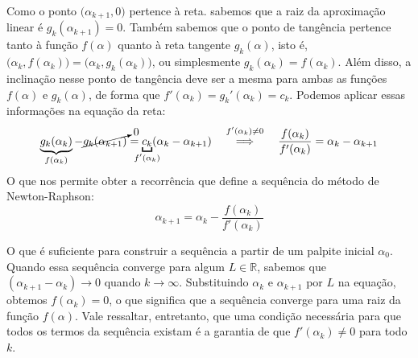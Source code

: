 Como o ponto $\big(\alpha_{k+1}, 0\big)$ pertence à reta.
sabemos que a raiz da aproximação linear é $g_k(\alpha_{k+1}) = 0$.
Também sabemos que o ponto de tangência
pertence tanto à função $f(\alpha)$
quanto à reta tangente $g_k(\alpha)$, isto é,
$\big(\alpha_k, f(\alpha_k)\big) = \big(\alpha_k, g_k(\alpha_k)\big)$,
ou simplesmente $g_k(\alpha_k) = f(\alpha_k)$.
Além disso, a inclinação nesse ponto de tangência
deve ser a mesma para ambas as funções $f(\alpha)$ e $g_k(\alpha)$,
de forma que $f'(\alpha_k) = g_k'(\alpha_k) = c_k$.
Podemos aplicar essas informações na equação da reta:
\[
    \underbrace{g_k(\alpha_k)}_{f(\alpha_k)}
    - \cancelto{0}{g_k(\alpha_{k+1})}
  =
    \underbracket[1.1pt]{c_k}_{\mathclap{f'(\alpha_k)}}
    (\alpha_k - \alpha_{k+1})
  \quad\stackfirst{f'(\alpha_k) \ne 0}{\implies}\quad
  \dfrac{f(\alpha_k)}{f'(\alpha_k)} = \alpha_k - \alpha_{k+1}
\]
O que nos permite obter a recorrência
que define a sequência do método de Newton-Raphson:
\[\tag{NR}
  \alpha_{k+1} = \alpha_k - \dfrac{f(\alpha_k)}{f'(\alpha_k)}
\]

O que é suficiente para construir a sequência
a partir de um palpite inicial $\alpha_0$.
Quando essa sequência converge para algum $L \in \mathds{R}$,
sabemos que $(\alpha_{k+1} - \alpha_k) \to 0$
quando $k \to \infty$.
Substituindo $\alpha_k$ e $\alpha_{k+1}$ por $L$ na equação,
obtemos $f(\alpha_k) = 0$,
o que significa que a sequência converge
para uma raiz da função $f(\alpha)$.
Vale ressaltar, entretanto,
que uma condição necessária
para que todos os termos da sequência existam
é a garantia de que $f'(\alpha_k) \ne 0$ para todo $k$.
